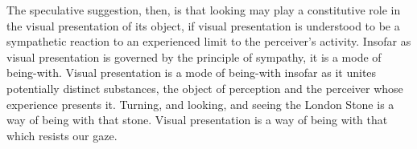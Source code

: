 \documentclass[12pt]{article}
\begin{document}
The speculative suggestion, then, is that looking may play a constitutive role
in the visual presentation of its object, if visual presentation is understood to be a sympathetic reaction to an experienced limit to the perceiver’s activity. Insofar as visual presentation is governed by the principle of sympathy, it is a mode of being-with. Visual presentation is a mode of being-with insofar as it unites potentially distinct substances, the object of perception and the perceiver whose experience presents it. Turning, and looking, and seeing the London Stone is a way of being with that stone. Visual presentation is a way of being with that which resists our gaze.
\end{document}
